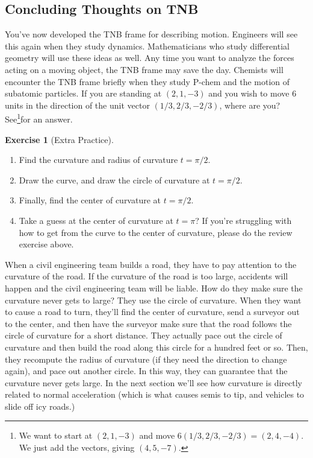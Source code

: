 \documentclass[10pt,]{book}
\theoremstyle{plain}
\theoremstyle{definition}
\theoremstyle{definition}
\theoremstyle{definition}
\theoremstyle{definition}
\newtheorem{exploration}[project]{Exercise}
\theoremstyle{definition}
\numberwithin{equation}{section}
\begin{document}
\subsection[{Concluding Thoughts on TNB}]{Concluding Thoughts on TNB}\label{subsection-26}
You've now developed the TNB frame for describing motion. Engineers will see this again when they study dynamics. Mathematicians who study differential geometry will use these ideas as well. Any time you want to analyze the forces acting on a moving object, the TNB frame may save the day. Chemists will encounter the TNB frame briefly when they study P-chem and the motion of subatomic particles.%
If you are standing at \((2,1,-3)\) and you wish to move 6 units in the direction of the unit vector \((1/3, 2/3, -2/3)\), where are you? See\footnote{We want to start at \((2,1,-3)\) and move \(6(1/3, 2/3, -2/3) = (2,4,-4)\). We just add the vectors, giving \((4,5,-7)\).\label{fn-14}}for an answer.%
\begin{exploration}[Extra Practice]\label{exploration-180}
\leavevmode%
\begin{enumerate}[font=\bfseries,label=(\alph*),ref=\alph*]
\item\label{task-442} Find the curvature and radius of curvature \(t=\pi/2\).%
\item\label{task-443} Draw the curve, and draw the circle of curvature at \(t=\pi/2\).%
\item\label{task-444} Finally, find the center of curvature at \(t=\pi/2\).%
\item\label{task-445} Take a guess at the center of curvature at \(t=\pi\)? If you're struggling with how to get from the curve to the center of curvature, please do the review exercise above.%
%
\end{enumerate}
\end{exploration}
When a civil engineering team builds a road, they have to pay attention to the curvature of the road. If the curvature of the road is too large, accidents will happen and the civil engineering team will be liable. How do they make sure the curvature never gets to large? They use the circle of curvature. When they want to cause a road to turn, they'll find the center of curvature, send a surveyor out to the center, and then have the surveyor make sure that the road follows the circle of curvature for a short distance. They actually pace out the circle of curvature and then build the road along this circle for a hundred feet or so. Then, they recompute the radius of curvature (if they need the direction to change again), and pace out another circle. In this way, they can guarantee that the curvature never gets large. In the next section we'll see how curvature is directly related to normal acceleration (which is what causes semis to tip, and vehicles to slide off icy roads.)%
\typeout{************************************************}
\typeout{************************************************}
\end{document}

